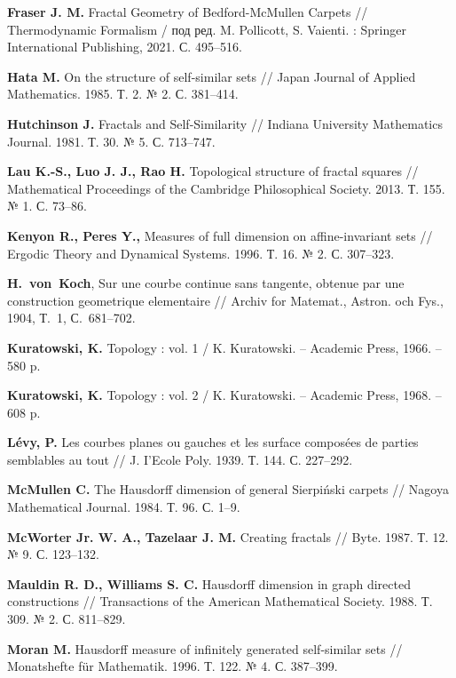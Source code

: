 \begin{thebibliography}{99}
{\bf Fraser J. M. }
Fractal Geometry of Bedford-McMullen Carpets // 
Thermodynamic Formalism / под ред. M. Pollicott, S. Vaienti. : Springer International Publishing, 2021. С. 495--516.

{\bf Hata M. }
On the structure of self-similar sets // 
Japan Journal of Applied Mathematics. 1985. Т. 2. № 2. С. 381–414.

{\bf Hutchinson J. }
Fractals and Self-Similarity // 
Indiana University Mathematics Journal. 1981. Т. 30. № 5. С. 713–747.

{\bf Lau K.-S., Luo J. J., Rao H. }
Topological structure of fractal squares // 
Mathematical Proceedings of the Cambridge Philosophical Society. 2013. Т. 155. № 1. С. 73--86.

{\bf Kenyon R., Peres Y.,} 
Measures of full dimension on affine-invariant sets // 
Ergodic Theory and Dynamical Systems. 1996. Т. 16. № 2. С. 307–323.

{\bf H.~von~Koch},  
Sur une courbe continue sans tangente, obtenue par
une construction geometrique elementaire // 
Archiv for Matemat., Astron. och Fys., 1904, Т.~1, С.~681--702.

{\bf Kuratowski, K.} 
Topology : vol. 1 / 
K. Kuratowski. -- Academic Press, 1966. -- 580 p.

{\bf Kuratowski, K.} 
Topology : vol. 2 / 
K. Kuratowski. -- Academic Press, 1968. -- 608 p.

{\bf L{\'e}vy, P.} 
Les courbes planes ou gauches et les surface compos{\'e}es de parties semblables au tout // 
J. I’Ecole Poly. 1939. Т. 144. С. 227--292.

{\bf McMullen C. }
The Hausdorff dimension of general Sierpiński carpets // 
Nagoya Mathematical Journal. 1984. Т. 96. С. 1–9.

{\bf McWorter Jr. W. A., Tazelaar J. M.}
Creating fractals // 
Byte. 1987. Т. 12. № 9. С. 123--132.

{\bf Mauldin R. D., Williams S. C.}
Hausdorff dimension in graph directed constructions // 
Transactions of the American Mathematical Society. 1988. Т. 309. № 2. С. 811--829.

{\bf Moran M.}
Hausdorff measure of infinitely generated self-similar sets // 
Monatshefte für Mathematik. 1996. Т. 122. № 4. С. 387--399.


\end{thebibliography}
